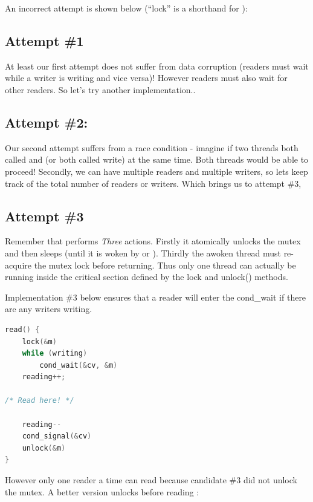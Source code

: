 An incorrect attempt is shown below (``lock'' is a shorthand for ):

\subsection{Attempt \#1}\label{attempt-1}

At least our first attempt does not suffer from data corruption (readers must wait while a writer is writing and vice versa)! However readers must also wait for other readers. So let's try another implementation..

\subsection{Attempt \#2:}\label{attempt-2}

Our second attempt suffers from a race condition - imagine if two threads both called  and  (or both called write) at the same time. Both threads would be able to proceed! Secondly, we can have multiple readers and multiple writers, so lets keep track of the total number of readers or writers. Which brings us to attempt \#3,

\subsection{Attempt \#3}\label{attempt-3}

Remember that  performs \emph{Three} actions. Firstly it atomically unlocks the mutex and then sleeps (until it is woken by  or ). Thirdly the awoken thread must re-acquire the mutex lock before returning. Thus only one thread can actually be running inside the critical section defined by the lock and unlock() methods.

Implementation \#3 below ensures that a reader will enter the cond\_wait if there are any writers writing.

\begin{lstlisting}[language=C]
read() {
    lock(&m)
    while (writing)
        cond_wait(&cv, &m)
    reading++;

/* Read here! */

    reading--
    cond_signal(&cv)
    unlock(&m)
}
\end{lstlisting}

However only one reader a time can read because candidate \#3 did not unlock the mutex. A better version unlocks before reading :

